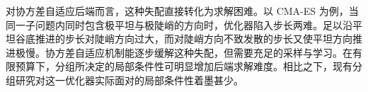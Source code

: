 对协方差自适应后端而言，这种失配直接转化为求解困难。以 CMA-ES 为例，当同一子问题内同时包含极平坦与极陡峭的方向时，优化器陷入步长两难。足以沿平坦谷底推进的步长对陡峭方向过大，而对陡峭方向不致发散的步长又使平坦方向推进极慢。协方差自适应机制能逐步缓解这种失配，但需要充足的采样与学习。在有限预算下，分组所决定的局部条件性可明显增加后端求解难度。相比之下，现有分组研究对这一优化器实际面对的局部条件性着墨甚少。